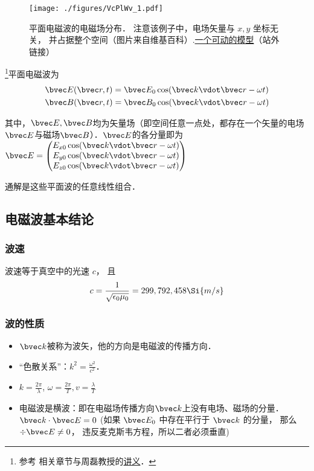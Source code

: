 

\begin{figure}[ht]
\centering
\texttt{[image: ./figures/VcPlWv\_1.pdf]}
\caption{平面电磁波的电磁场分布． 注意该例子中，电场矢量与 $x, y$ 坐标无关， 并占据整个空间（图片来自维基百科）.\href{https://www.geogebra.org/m/xhYwXSsH}{一个可动的模型}（站外链接）} \label{VcPlWv_fig1}
\end{figure}

\footnote{参考 \cite{GriffE} 相关章节与周磊教授的\href{http://fdjpkc.fudan.edu.cn/d200927/2009/0314/c8569a14801/page.htm}{讲义}．}平面电磁波为
\begin{align}
&\bvec E(\bvec r, t) = \bvec E_0 \cos(\bvec k\vdot \bvec r - \omega t)\\
&\bvec B(\bvec r, t) = \bvec B_0 \cos(\bvec k \vdot \bvec r - \omega t)
\end{align}

其中，$\bvec E, \bvec B$均为矢量场（即空间任意一点处，都存在一个矢量的电场$\bvec E$与磁场$\bvec B$）．$\bvec E$的各分量即为
$\bvec E = 
\begin{pmatrix}
E_{x0} \cos(\bvec k\vdot \bvec r - \omega t)\\
E_{y0} \cos(\bvec k\vdot \bvec r - \omega t)\\
E_{z0} \cos(\bvec k\vdot \bvec r - \omega t)\\
\end{pmatrix}
$

通解是这些平面波的任意线性组合． 

\subsection{电磁波基本结论}
\subsubsection{波速}
波速等于真空中的光速 $c$， 且
\begin{equation}\label{VcPlWv_eq1}
c = \frac{1}{\sqrt{\epsilon_0\mu_0}} = 299,792,458 \Si{m/s}
\end{equation}

\subsubsection{波的性质}
\begin{itemize}
\item $\bvec k$被称为波矢，他的方向是电磁波的传播方向．
\item  “色散关系”：$k^2=\frac{\omega^2}{c^2}$．
\item $k=\frac{2\pi}{\lambda}$, $\omega=\frac{2\pi}{T}, v=\frac{\lambda}{T}$
\item 电磁波是横波：即在电磁场传播方向$\bvec k$上没有电场、磁场的分量．$\bvec k \cdot \bvec E = 0$ (如果 $\bvec E_0$ 中存在平行于 $\bvec k$ 的分量， 那么 $\div \bvec E \ne 0$， 违反麦克斯韦方程，所以二者必须垂直)
\end{itemize}

